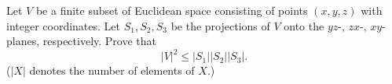 Let $V$ be a finite subset of Euclidean space consisting of points $(x, y, z)$ with integer coordinates. Let $S_1, S_2, S_3$ be the projections of $V$ onto the $yz$-, $zx$-, $xy$-planes, respectively. Prove that
\[ |V|^2 \leq |S_1| |S_2| |S_3|. \]
($|X|$ denotes the number of elements of $X$.)
